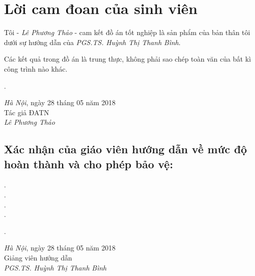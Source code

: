 \section*{Lời cam đoan của sinh viên}
Tôi - \textit{Lê Phương Thảo} - cam kết đồ án tốt nghiệp là sản phẩm  của bản thân tôi dưới sự hướng dẫn của \textit{PGS.TS. Huỳnh Thị Thanh Bình}.

Các kết quả trong đồ án là trung thực, không phải sao chép toàn văn của bất kì công trình nào khác.\\

\begin{minipage}{0.5\textwidth}
.
\end{minipage}
\begin{minipage}[t]{0.5\textwidth}



\begin{center}
	\textit{Hà Nội}, ngày 28 tháng 05 năm 2018 \\
	Tác giả ĐATN\\[3cm]
	
	\textit{Lê Phương Thảo}
\end{center}
\end{minipage}
\subsection*{Xác nhận của giáo viên hướng dẫn về mức độ hoàn thành và cho phép bảo vệ:}
.\dotfill \\
.\dotfill \\ 
.\dotfill \\ 
.\dotfill \\
\begin{minipage}{0.5\textwidth}
.
\end{minipage}
\begin{minipage}[t]{0.5\textwidth}

\begin{center}
	\textit{Hà Nội}, ngày 28 tháng 05 năm 2018 \\
	Giảng viên hướng dẫn\\[3cm]
	
	\textit{PGS.TS. Huỳnh Thị Thanh Bình}
\end{center}
\end{minipage}
